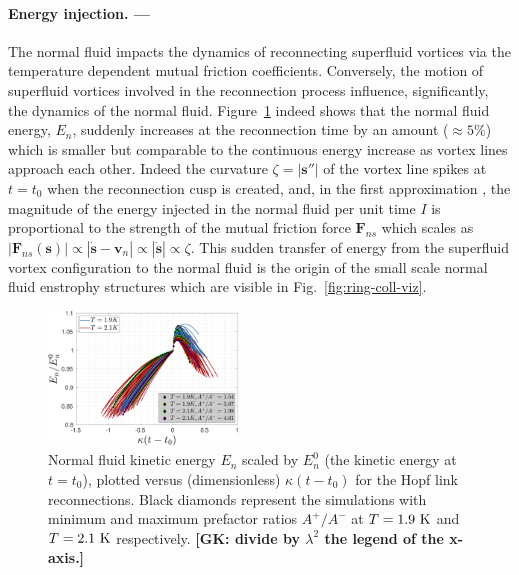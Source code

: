 \documentclass[%
 reprint,
 amsmath,amssymb,
 aps,
 prl,
]{revtex4-2}
\def \s{\mathbf{s}}
\def \v{\mathbf{v}}
\newcommand*{\NOTE}[1]{\textbf{\color{red}[#1]}}
\begin{document}
\paragraph*{Energy injection. ---}
The normal fluid impacts the dynamics of reconnecting superfluid vortices via the temperature dependent mutual friction coefficients. Conversely, the motion of superfluid vortices involved in the reconnection process influence, significantly, the dynamics of the normal fluid. Figure~\ref{fig:energy-evol} indeed shows that the normal fluid energy, $E_n$,
suddenly increases at the reconnection time by an amount ($\approx 5\%$)
which is smaller but comparable to the continuous energy increase as vortex
lines approach each other. Indeed the
curvature $\zeta=|\s''|$ of the vortex line 
spikes at $t=t_0$ when
the reconnection cusp is created, and, in the first approximation \cite{galantucci-krstulovic-etal-2023},
the magnitude of the energy injected in the normal fluid per unit time $I$
is proportional to the strength of the mutual friction force $\mathbf{F}_{ns}$ which scales as
$|\mathbf{F}_{ns}(\s)|\propto|\dot{\s}-\v_n|\propto|\dot{\s}|\propto\zeta$. This sudden
transfer of energy
\cite{stasiakCrossComponentEnergyTransfer2024} from the superfluid
vortex configuration to the normal fluid is the origin of the 
small scale normal fluid enstrophy structures
which are visible in Fig.~\ref{fig:ring-coll-viz}.




\begin{figure}
	\centering
	\includegraphics*[width=0.45\textwidth]{energy-evolution.pdf}
	\caption{Normal fluid kinetic energy $E_n$ scaled by $E_n^0$ (the 
kinetic energy at $t=t_0$), plotted versus (dimensionless)
$\kappa (t-t_0)$ for the Hopf link reconnections. Black diamonds represent the simulations 
with minimum and maximum prefactor ratios $A^+/A^-$ at $T=1.9~\rm K$ and 
$T=2.1~\rm K$ respectively. \NOTE{GK: divide by $\lambda^2$ the legend of the x-axis.}}
	\label{fig:energy-evol}
\end{figure}
\end{document}
